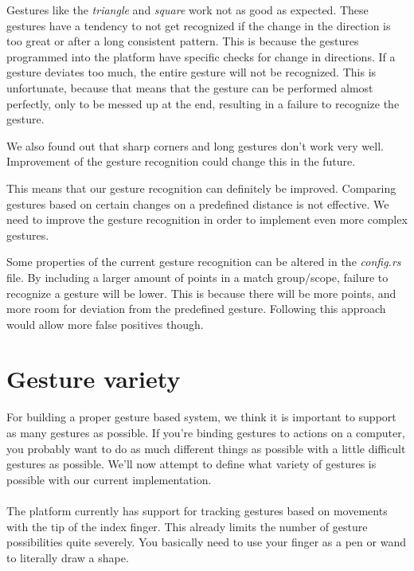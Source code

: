 \documentclass[a4paper]{article}
\begin{document}
  Gestures like the \textit{triangle} and \textit{square} work not as good as
  expected. These gestures have a tendency to not get recognized if the change
  in the direction is too great or after a long consistent pattern. This is
  because the gestures programmed into the platform have specific checks for
  change in directions. If a gesture deviates too much, the entire gesture will
  not be recognized. This is unfortunate, because that means that the gesture
  can be performed almost perfectly, only to be messed up at the end, resulting
  in a failure to recognize the gesture.

  We also found out that sharp corners and long gestures don't work very well.
  Improvement of the gesture recognition could change this in the future.

  This means that our gesture recognition can definitely be improved. Comparing
  gestures based on certain changes on a predefined distance is not effective.
  We need to improve the gesture recognition in order to implement even more
  complex gestures.

  Some properties of the current gesture recognition can be altered in the
  \textit{config.rs} file. By including a larger amount of points in a match
  group/scope, failure to recognize a gesture will be lower. This is because
  there will be more points, and more room for deviation from the predefined
  gesture. Following this approach would allow more false positives though.

  \clearpage

  \section*{Gesture variety}
  For building a proper gesture based system, we think it is important to
  support as many gestures as possible. If you're binding gestures to actions on
  a computer, you probably want to do as much different things as possible with
  a little difficult gestures as possible. We'll now attempt to define what
  variety of gestures is possible with our current implementation.

  \paragraph{}
  The platform currently has support for tracking gestures based on movements
  with the tip of the index finger. This already limits the number of gesture
  possibilities quite severely. You basically need to use your finger as a pen
  or wand to literally draw a shape.
\end{document}
